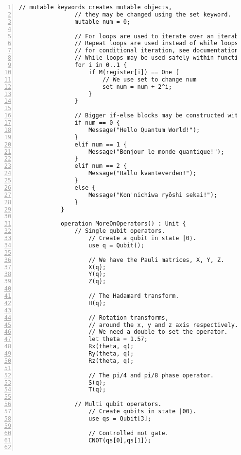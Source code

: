 \documentclass[
10pt, %
a4  paper, %
twoside, %
headinclude,footinclude, %
BCOR=5mm, %
]{scrartcl}
\begin{document}
\begin{Verbatim}[gobble=2, numbers=left, frame=lines,
        framesep=3mm,
        label={[Beginning of code]End of code}]
                // mutable keywords creates mutable objects, 
                // they may be changed using the set keyword.
                mutable num = 0;
                
                // For loops are used to iterate over an iterable object
                // Repeat loops are used instead of while loops
                // for conditional iteration, see documentation for more info.
                // While loops may be used safely within function statements.
                for i in 0..1 {
                    if M(register[i]) == One {
                        // We use set to change num
                        set num = num + 2^i;
                    }
                }

                // Bigger if-else blocks may be constructed with elif.
                if num == 0 {
                    Message("Hello Quantum World!");
                }
                elif num == 1 {
                    Message("Bonjour le monde quantique!");
                }
                elif num == 2 {
                    Message("Hallo kvanteverden!");
                }
                else {
                    Message("Kon'nichiwa ryōshi sekai!");
                }
            }

            operation MoreOnOperators() : Unit {
                // Single qubit operators.
                    // Create a qubit in state |0⟩.
                    use q = Qubit();

                    // We have the Pauli matrices, X, Y, Z.
                    X(q);
                    Y(q);
                    Z(q);

                    // The Hadamard transform.
                    H(q);

                    // Rotation transforms,
                    // around the x, y and z axis respectively.
                    // We need a double to set the operator.
                    let theta = 1.57;
                    Rx(theta, q);
                    Ry(theta, q);
                    Rz(theta, q);

                    // The pi/4 and pi/8 phase operator.
                    S(q);
                    T(q);

                // Multi qubit operators.
                    // Create qubits in state |00⟩.
                    use qs = Qubit[3];

                    // Controlled not gate.
                    CNOT(qs[0],qs[1]);


\end{Verbatim}
\end{document}
